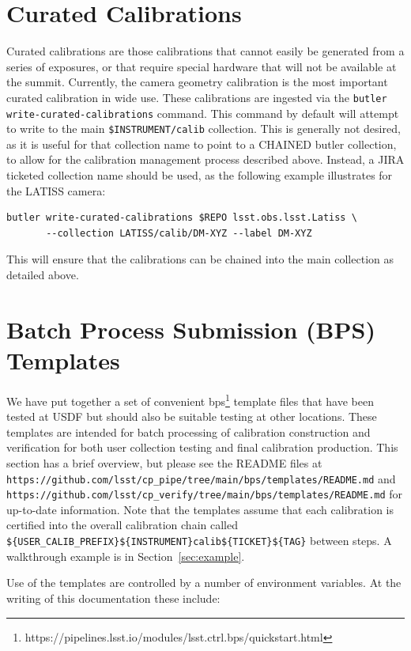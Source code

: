 \documentclass[DM,authoryear,toc]{lsstdoc}
\begin{document}
\section{Curated Calibrations}

Curated calibrations are those calibrations that cannot easily be generated from a series of exposures, or that require special hardware that will not be available at the summit.
Currently, the camera geometry calibration is the most important curated calibration in wide use.
These calibrations are ingested via the \verb|butler write-curated-calibrations| command.
This command by default will attempt to write to the main \verb|$INSTRUMENT/calib| collection.
This is generally not desired, as it is useful for that collection name to point to a CHAINED butler collection, to allow for the calibration management process described above.
Instead, a JIRA ticketed collection name should be used, as the following example illustrates for the LATISS camera:
\begin{verbatim}
butler write-curated-calibrations $REPO lsst.obs.lsst.Latiss \
       --collection LATISS/calib/DM-XYZ --label DM-XYZ
\end{verbatim}

This will ensure that the calibrations can be chained into the main collection as detailed above.

\section{Batch Process Submission (BPS) Templates}

We have put together a set of convenient bps\footnote{https://pipelines.lsst.io/modules/lsst.ctrl.bps/quickstart.html} template files that have been tested at USDF but should also be suitable testing at other locations.
These templates are intended for batch processing of calibration construction and verification for both user collection testing and final calibration production.
This section has a brief overview, but please see the README files at \texttt{https://github.com/lsst/cp\_pipe/tree/main/bps/templates/README.md} and \texttt{https://github.com/lsst/cp\_verify/tree/main/bps/templates/README.md} for up-to-date information.
Note that the templates assume that each calibration is certified into the overall calibration chain called \texttt{\$\{USER\_CALIB\_PREFIX\}\$\{INSTRUMENT\}\/calib\/\$\{TICKET\}\/\$\{TAG\}} between steps.
A walkthrough example is in Section~\ref{sec:example}.

Use of the templates are controlled by a number of environment variables.
At the writing of this documentation these include:
\end{document}

